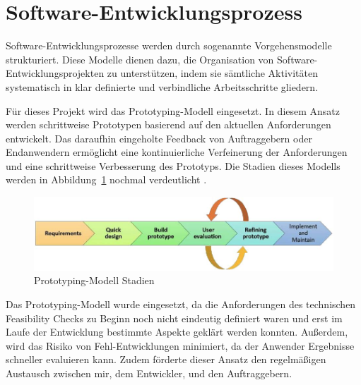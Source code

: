 \section{Software-Entwicklungsprozess}
Software-Entwicklungsprozesse werden durch sogenannte Vorgehensmodelle strukturiert. Diese Modelle dienen dazu, die Organisation von Software-Entwicklungsprojekten zu unterstützen, indem sie sämtliche Aktivitäten systematisch in klar definierte und verbindliche Arbeitsschritte gliedern.

Für dieses Projekt wird das Prototyping-Modell eingesetzt. In diesem Ansatz werden schrittweise Prototypen basierend auf den aktuellen Anforderungen entwickelt. Das daraufhin eingeholte Feedback von Auftraggebern oder Endanwendern ermöglicht eine kontinuierliche Verfeinerung der Anforderungen und eine schrittweise Verbesserung des Prototyps. Die Stadien dieses Modells werden in Abbildung~\ref{fig:Prototyping-Modell} nochmal verdeutlicht \cite{senarath2021waterfall}.

\begin{figure}[h!]
    \centering
    \includegraphics[]{bilder/Prototyping_Stages.jpg}
    \caption{Prototyping-Modell Stadien \cite{senarath2021waterfall}}
    \label{fig:Prototyping-Modell}
\end{figure}


Das Prototyping-Modell wurde eingesetzt, da die Anforderungen des technischen Feasibility Checks zu Beginn noch nicht eindeutig definiert waren und erst im Laufe der Entwicklung bestimmte Aspekte geklärt werden konnten. Außerdem, wird das Risiko von Fehl-Entwicklungen minimiert, da der Anwender Ergebnisse schneller evaluieren kann. Zudem förderte dieser Ansatz den regelmäßigen Austausch zwischen mir, dem Entwickler, und den Auftraggebern.